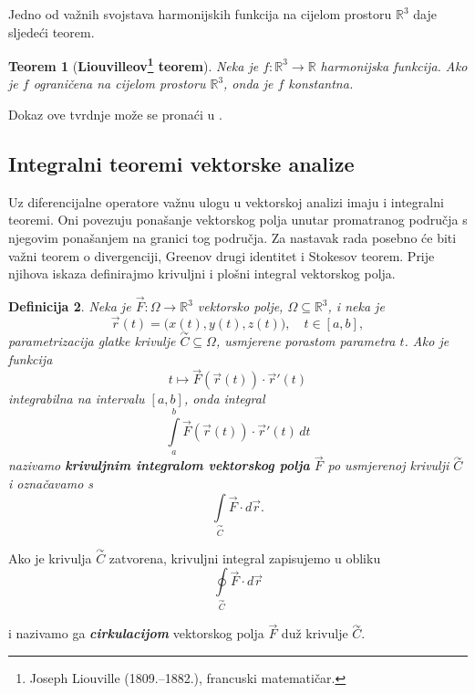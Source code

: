 \documentclass[12pt,a4paper]{article}
\makeatletter
\newtheorem{tm}{Teorem}[section]
\newtheorem{deff}[tm]{Definicija}
\renewenvironment{proof}[1][\proofname]{\par
  \pushQED{\qed}%
  \normalfont
  \topsep6\p@\@plus6\p@\relax
  \trivlist
  \item[\hskip\labelsep
  \bfseries #1\@addpunct{.}]\ignorespaces
}{%
  \popQED\endtrivlist\@endpefalse
}
\makeatother
\begin{document}
Jedno od važnih svojstava harmonijskih funkcija na cijelom prostoru $\mathbb{R}^3$
daje sljedeći teorem.

\begin{tm}[\textbf{Liouvilleov\footnote{Joseph Liouville (1809.--1882.), francuski matematičar.} teorem}]
Neka je $f:\mathbb{R}^3\to\mathbb{R}$ harmonijska funkcija.
Ako je $f$ ograničena na cijelom prostoru $\mathbb{R}^3$, onda je
$f$ konstantna.
\end{tm}
\begin{proof}
Dokaz ove tvrdnje može se pronaći u \cite{evans}.
\end{proof}

\subsection{Integralni teoremi vektorske analize}

Uz diferencijalne operatore važnu ulogu u vektorskoj analizi imaju i
integralni teoremi. Oni povezuju ponašanje vektorskog polja unutar
promatranog područja s njegovim ponašanjem na granici tog područja.
Za nastavak rada posebno će biti važni teorem o divergenciji,
Greenov drugi identitet i Stokesov teorem. Prije njihova iskaza definirajmo krivuljni
i plošni integral vektorskog polja.


\begin{deff}
Neka je $\overrightarrow{F}:\Omega\to\mathbb{R}^3$ vektorsko polje,
$\Omega\subseteq\mathbb{R}^3$, i neka je
\[
\overrightarrow{r}(t)
=
\bigl(x(t),y(t),z(t)\bigr),
\quad t\in[a,b],
\]
parametrizacija glatke krivulje $\overset{\curvearrowright}{C}\subseteq\Omega$, usmjerene porastom
parametra $t$. Ako je funkcija
\[
t\longmapsto
\overrightarrow{F}(\overrightarrow{r}(t))
\cdot
\overrightarrow{r}'(t)
\]
integrabilna na intervalu $[a,b]$, onda integral
\[
\int\limits_a^b
\overrightarrow{F}(\overrightarrow{r}(t))
\cdot
\overrightarrow{r}'(t)\,dt
\]
nazivamo \textbf{\textit{krivuljnim integralom vektorskog polja}}
$\overrightarrow{F}$ po usmjerenoj krivulji $\overset{\curvearrowright}{C}$ i označavamo s
\[
\int\limits_{\overset{\curvearrowright}{C}}
\overrightarrow{F}\cdot d\overrightarrow{r}.
\]
\end{deff}


Ako je krivulja $\overset{\curvearrowright}{C}$ zatvorena, krivuljni integral zapisujemo u obliku
$$
\oint\limits_{\overset{\curvearrowright}{C}}
\overrightarrow{F}\cdot d\overrightarrow{r}
$$

i nazivamo ga \textbf{\textit{cirkulacijom}} vektorskog polja $\overrightarrow{F}$
duž krivulje $\overset{\curvearrowright}{C}$.
\end{document}
